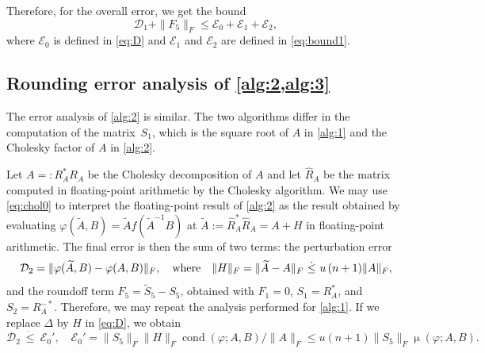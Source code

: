 \documentclass[DIV=14]{scrartcl}
\newcommand\ledot{~\dot{\le}~}
\theoremstyle{thmstyletwo}
\theoremstyle{definition}
\numberwithin{equation}{section}
\newcommand{\wh}{\widehat}
\newcommand{\wt}{\widetilde}
\renewcommand{\Delta}{\varDelta}
\newcommand{\deq}{\ensuremath{:=}}
\newcommand{\deqr}{\ensuremath{=:}}
\DeclareMathOperator{\cond}{\mu}
\begin{document}
{Therefore, for the overall error, we get the bound
\begin{equation}\label{eq:bound1bis}
\mathcal D_1 + \|F_5\|_F\le \mathcal E_0+\mathcal E_1+\mathcal E_2,
\end{equation}
where $\mathcal E_0$ is defined in \eqref{eq:D} and $\mathcal E_1$ and $\mathcal E_2$ are defined in \eqref{eq:bound1}.

\subsection{Rounding error analysis of \cref{alg:2,alg:3}}\label{sec:alg2}
The error analysis of \cref{alg:2} is similar.
The two algorithms differ in the computation of the matrix~$S_1$, which is the square root of $A$ in \cref{alg:1} and the Cholesky factor of $A$ in \cref{alg:2}.

Let $A\deqr{}R_A^*R_A$ be the Cholesky decomposition of $A$ and let $\wh R_A$ be the matrix computed in floating-point arithmetic by the Cholesky algorithm. We may use \eqref{eq:chol0} to interpret the floating-point result of \cref{alg:2} as the result obtained by evaluating $\varphi(\wt A,B)=\wt Af(\wt A^{-1}B)$ at \mbox{$\wt A \deq{} \wh R_A^*\wh R_A=A+H$} in floating-point arithmetic.
The final error is then the sum of two terms: the perturbation error
\begin{equation}\label{eq:Hbis}
\mathcal D_2=\|\varphi(\wt A,B)-\varphi(A,B)\|_F,\quad \hbox{where} \quad \|H\|_F=\|\wt A-A\|_F\ledot u\, (n+1)\| A \|_F,
\end{equation}
and the roundoff term $F_5 = \wt S_5 - S_5$, obtained with $F_1=0$, $S_1=R_A^*$, and $S_2=R_A^{-*}$.
Therefore, we may repeat the analysis performed for \cref{alg:1}.
If we replace $\Delta$ by $H$ in \eqref{eq:D}, we obtain
\begin{equation}\label{eq:Dbis}
\mathcal D_2\ledot \mathcal E_0',\quad \mathcal E_0'=\|S_5\|_F\|H\|_F
\operatorname{cond}(\varphi;A,B)/
\|A\|_F\le
u(n+1)\|S_5\|_F\cond(\varphi;A,B)
.
\end{equation}


}
\end{document}
